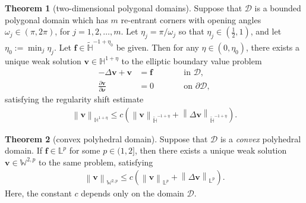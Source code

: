 \documentclass[11pt,reqno]{amsart}
\theoremstyle{definition}
\newtheorem{theorem}{Theorem}[section]
\numberwithin{equation}{section}
\newcommand{\bff}{\boldsymbol}
\newcommand{\bb}{\mathbb}
\newcommand{\pa}{\partial}
\newcommand{\norm}[2]{\left\|{#1}\right\|_{#2}}
\begin{document}
\begin{theorem}[two-dimensional polygonal domains]\label{the:ell reg polyg}
Suppose that $\mathscr{D}$ is a bounded polygonal domain which has $m$ re-entrant corners with opening angles $\omega_j \in (\pi,2\pi)$, for $j=1,2,\ldots,m$. Let $\eta_j=\pi/\omega_j$ so that $\eta_j\in (\frac12,1)$, and let $\eta_0 := \min_j \eta_j$. Let $\bff{f}\in \widetilde{\bb{H}}^{-1+\eta_0}$ be given. Then for any $\eta \in (0, \eta_0)$, there exists a unique weak solution $\bff{v}\in \bb{H}^{1+\eta}$ to the elliptic boundary value problem
\begin{subequations}\label{equ:elliptic}
	\begin{alignat}{2}
		-\Delta \bff{v}+ \bff{v} &=\bff{f}
		\qquad&
		&\text{in } \mathscr{D},
		\label{equ:elliptic equ}
		\\
		\frac{\pa\bff{v}}{\pa\bff{\nu}} &= 0
		\qquad&
		&\text{on } \pa \mathscr{D},
		\label{equ:elliptic equ bou con}
	\end{alignat}
\end{subequations}
satisfying the regularity shift estimate
\begin{align}\label{equ:shift polyg H1s}
	\norm{\bff{v}}{\bb{H}^{1+\eta}} \leq c \left( \norm{\bff{v}}{\widetilde{\bb{H}}^{-1+\eta}} + \norm{\Delta \bff{v}}{\widetilde{\bb{H}}^{-1+\eta}} \right). 
\end{align}
\end{theorem}

\begin{theorem}[convex polyhedral domain]\label{the:ell reg polyhed}
Suppose that $\mathscr{D}$ is a \emph{convex} polyhedral domain. %
If $\bff{f}\in \bb{L}^p$ for some $p\in (1,2]$, then there exists a unique weak solution $\bff{v}\in \bb{W}^{2,p}$ to the same problem, satisfying
\begin{align}\label{equ:shift polyh W2p}
	\norm{\bff{v}}{\bb{W}^{2,p}} \leq c \left( \norm{\bff{v}}{\bb{L}^{p}} + \norm{\Delta \bff{v}}{\bb{L}^{p}} \right).
\end{align}
Here, the constant $c$ depends only on the domain $\mathscr{D}$.
\end{theorem}
\end{document}
